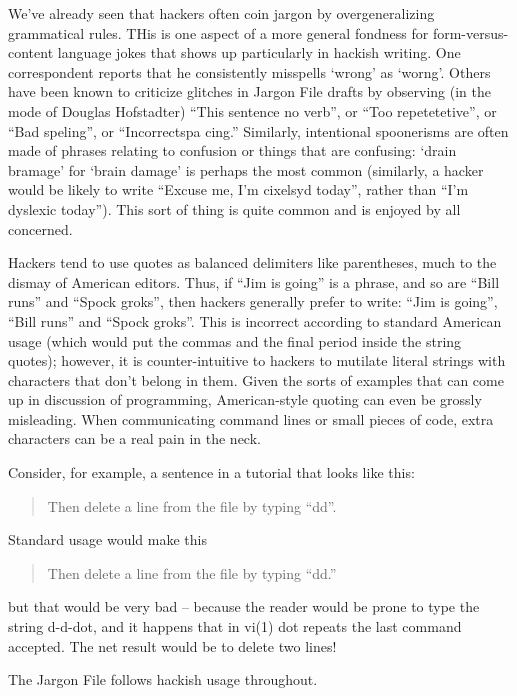 We've already seen that hackers often coin jargon by overgeneralizing grammatical rules. THis is one aspect of a more general fondness for
form-versus-content language jokes that shows up particularly in hackish writing. One correspondent reports that he consistently misspells
`wrong' as `worng'. Others have been known to criticize glitches in Jargon File drafts by observing (in the mode of Douglas Hofstadter)
``This sentence no verb'', or ``Too repetetetive'', or ``Bad speling'', or ``Incorrectspa cing.'' Similarly, intentional spoonerisms are
often made of phrases relating to confusion or things that are confusing: `drain bramage' for `brain damage' is perhaps the most common
(similarly, a hacker would be likely to write ``Excuse me, I'm cixelsyd today'', rather than ``I'm dyslexic today''). This sort of thing is
quite common and is enjoyed by all concerned.

Hackers tend to use quotes as balanced delimiters like parentheses, much to the dismay of American editors. Thus, if ``Jim is going'' is a
phrase, and so are ``Bill runs'' and ``Spock groks'', then hackers generally prefer to write: ``Jim is going'', ``Bill runs'' and ``Spock
groks''. This is incorrect according to standard American usage (which would put the commas and the final period inside the string quotes);
however, it is counter-intuitive to hackers to mutilate literal strings with characters that don't belong in them. Given the sorts of
examples that can come up in discussion of programming, American-style quoting can even be grossly misleading. When communicating command
lines or small pieces of code, extra characters can be a real pain in the neck.

Consider, for example, a sentence in a  tutorial that looks like this:

\begin{quote}
	Then delete a line from the file by typing ``dd''.
\end{quote}

Standard usage would make this

\begin{quote}
	Then delete a line from the file by typing ``dd.''
\end{quote}

but that would be very bad -- because the reader would be prone to type the string d-d-dot, and it happens that in vi(1) dot repeats the
last command accepted. The net result would be to delete two lines!

The Jargon File follows hackish usage throughout.

